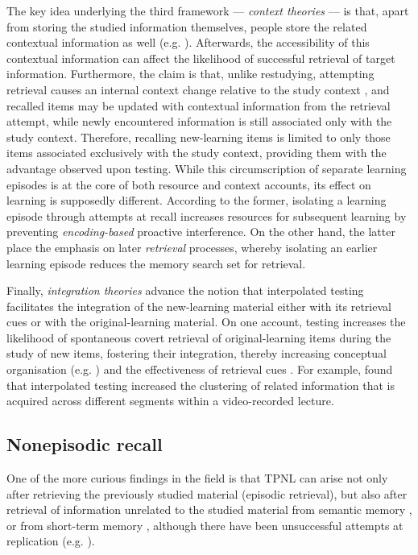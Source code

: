 \documentclass[../main.tex]{subfiles}
\begin{document}
The key idea underlying the third framework --- \textit{context theories} --- is that, apart from storing the studied information themselves, people store the related contextual information as well (e.g. \citealp{lehmanEpisodicContextAccount2014}). Afterwards, the accessibility of this contextual information can affect the likelihood of successful retrieval of target information. Furthermore, the claim is that, unlike restudying, attempting retrieval causes an internal context change relative to the study context \citep{jangContextRetrievalContext2008, sahakyanContextualChangeAccount2002}, and recalled items may be updated with contextual information from the retrieval attempt, while newly encountered information is still associated only with the study context. Therefore, recalling new-learning items is limited to only those items associated exclusively with the study context, providing them with the advantage observed upon testing. While this circumscription of separate learning episodes is at the core of both resource and context accounts, its effect on learning is supposedly different. According to the former, isolating a learning episode through attempts at recall increases resources for subsequent learning by preventing \textit{encoding-based} proactive interference. On the other hand, the latter place the emphasis on later \textit{retrieval} processes, whereby isolating an earlier learning episode reduces the memory search set for retrieval.

Finally, \textit{integration theories} advance the notion that interpolated testing facilitates the integration of the new-learning material either with its retrieval cues or with the original-learning material. On one account, testing increases the likelihood of spontaneous covert retrieval of original-learning items during the study of new items, fostering their integration, thereby increasing conceptual organisation (e.g. \citealp{jingInterpolatedTestingInfluences2016}) and the effectiveness of retrieval cues \citep{pycWhyTestingImproves2010}. For example, \cite{jingInterpolatedTestingInfluences2016} found that interpolated testing increased the clustering of related information that is acquired across different segments within a video-recorded lecture.

\hypertarget{nonepisodic}{%
\subsection{Nonepisodic recall}}

One of the more curious findings in the field is that TPNL can arise not only after retrieving the previously studied material (episodic retrieval), but also after retrieval of information unrelated to the studied material from semantic memory \citep{divisRetrievalSpeedsContext2014, pastotterRetrievalLearningFacilitates2011}, or from short-term memory \citep{pastotterRetrievalLearningFacilitates2011}, although there have been unsuccessful attempts at replication (e.g. \citealp{weinsteinNotAllRetrieval2015}).
\end{document}
